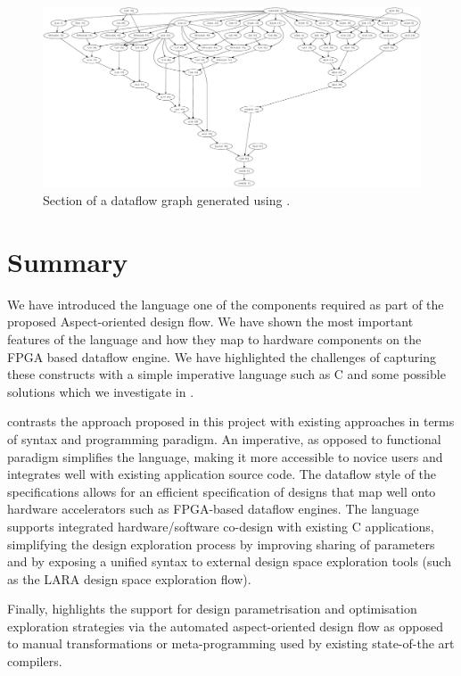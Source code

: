 \begin{figure}
\centering
\includegraphics[scale=0.5, clip=true, trim=880 740 650 0]{figs/MaxCtemplateDFG.png}
\caption{Section of a dataflow graph generated using \fastc{}.}
\label{fig:fast-dfg}
\end{figure}


\section{Summary}

We have introduced the \FAST{} language one of the components required
as part of the proposed Aspect-oriented design flow. We have shown the
most important features of the \FAST{} language and how they map to
hardware components on the FPGA based dataflow engine. We have
highlighted the challenges of capturing these constructs with a simple
imperative language such as C and some possible solutions which we
investigate in  .

 contrasts the \FAST{} approach
proposed in this project with existing approaches in terms of syntax
and programming paradigm. An imperative, as opposed to functional
paradigm simplifies the language, making it more accessible to novice
users and integrates well with existing application source code. The
dataflow style of the \FAST{} specifications allows for an efficient
specification of designs that map well onto hardware accelerators such
as FPGA-based dataflow engines. The language supports integrated
hardware/software co-design with existing C applications, simplifying
the design exploration process by improving sharing of parameters and
by exposing a unified syntax to external design space exploration
tools (such as the LARA design space exploration flow).

Finally,  highlights the support for design
parametrisation and optimisation exploration strategies via the
automated aspect-oriented design flow as opposed to manual
transformations or meta-programming used by existing state-of-the art
compilers.


